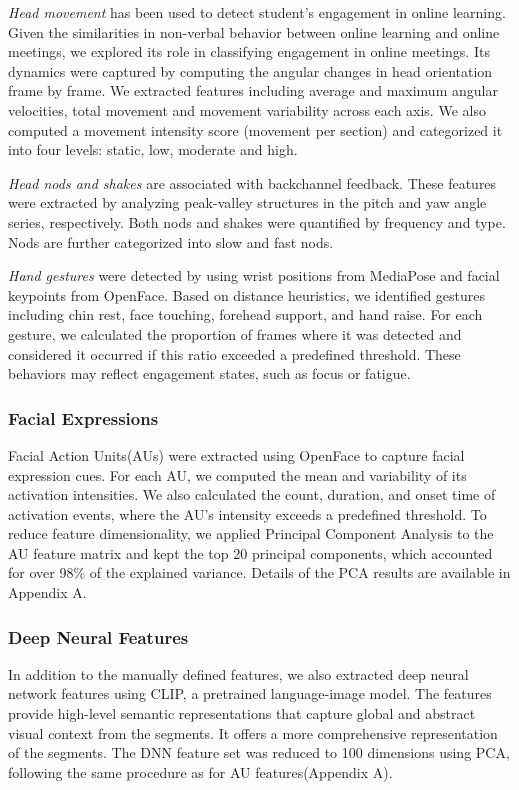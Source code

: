 \documentclass[
]{ceurart}
\begin{document}
\textit{Head movement} has been used to detect student’s engagement in online learning\cite{sharma2022engagement}. Given the similarities in non-verbal behavior between online learning and online meetings, we explored its role in classifying engagement in online meetings. Its dynamics were captured by computing the angular changes in head orientation frame by frame. We extracted features including average and maximum angular velocities, total movement and movement variability across each axis. We also computed a movement intensity score (movement per section) and categorized it into four levels: static, low, moderate and high.

\textit{Head nods and shakes} are associated with backchannel feedback. These features were extracted by analyzing peak-valley structures in the pitch and yaw angle series, respectively. Both nods and shakes were quantified by frequency and type. Nods are further categorized into slow and fast nods.

\textit{Hand gestures}
were detected by using wrist positions from MediaPose\cite{lugaresi2019mediapipe} and facial keypoints from OpenFace\cite{baltrusaitis2018openface}. Based on distance heuristics, we identified gestures including chin rest, face touching, forehead support, and hand raise. For each gesture, we calculated the proportion of frames where it was detected and considered it occurred if this ratio exceeded a predefined threshold. These behaviors may reflect engagement states, such as focus or fatigue. 

\subsubsection{Facial Expressions}
Facial Action Units(AUs) were extracted using OpenFace\cite{baltrusaitis2018openface} to capture facial expression cues. For each AU, we computed the mean and variability of its activation intensities. We also calculated the count, duration, and onset time of activation events, where the AU’s intensity exceeds a predefined threshold. To reduce feature dimensionality, we applied Principal Component Analysis to the AU feature matrix and kept the top 20 principal components, which accounted for over 98\% of the explained variance. Details of the PCA results are available in Appendix A. 

\subsubsection{Deep Neural Features}
In addition to the manually defined features, we also extracted deep neural network features using CLIP\cite{radford2021learning}, a pretrained language-image model. The features provide high-level semantic representations that capture global and abstract visual context from the segments. It offers a more comprehensive representation of the segments. The DNN feature set was reduced to 100 dimensions using PCA, following the same procedure as for AU features(Appendix A). 
\end{document}
